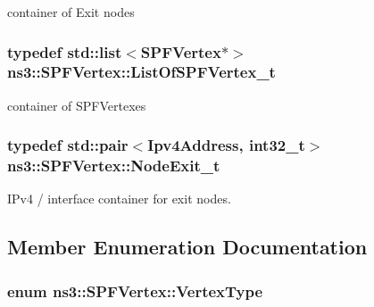 container of Exit nodes 

\subsubsection[{\texorpdfstring{List\+Of\+S\+P\+F\+Vertex\+\_\+t}{ListOfSPFVertex_t}}]{\setlength{\rightskip}{0pt plus 5cm}typedef {\bf std\+::list}$<${\bf S\+P\+F\+Vertex}$\ast$$>$ {\bf ns3\+::\+S\+P\+F\+Vertex\+::\+List\+Of\+S\+P\+F\+Vertex\+\_\+t}\hspace{0.3cm}{\ttfamily [private]}}\hypertarget{classns3_1_1SPFVertex_a505cf50e80726f5860b32e9dc34b6c9e}{}\label{classns3_1_1SPFVertex_a505cf50e80726f5860b32e9dc34b6c9e}


container of S\+P\+F\+Vertexes 

\subsubsection[{\texorpdfstring{Node\+Exit\+\_\+t}{NodeExit_t}}]{\setlength{\rightskip}{0pt plus 5cm}typedef std\+::pair$<${\bf Ipv4\+Address}, int32\+\_\+t$>$ {\bf ns3\+::\+S\+P\+F\+Vertex\+::\+Node\+Exit\+\_\+t}}\hypertarget{classns3_1_1SPFVertex_a0adf6255ec0357050ef5436597b4cb32}{}\label{classns3_1_1SPFVertex_a0adf6255ec0357050ef5436597b4cb32}


I\+Pv4 / interface container for exit nodes. 



\subsection{Member Enumeration Documentation}
\subsubsection[{\texorpdfstring{Vertex\+Type}{VertexType}}]{\setlength{\rightskip}{0pt plus 5cm}enum {\bf ns3\+::\+S\+P\+F\+Vertex\+::\+Vertex\+Type}}\hypertarget{classns3_1_1SPFVertex_a20f8a4cfc99a1b7ecd10a23151b93afd}{}\label{classns3_1_1SPFVertex_a20f8a4cfc99a1b7ecd10a23151b93afd}


